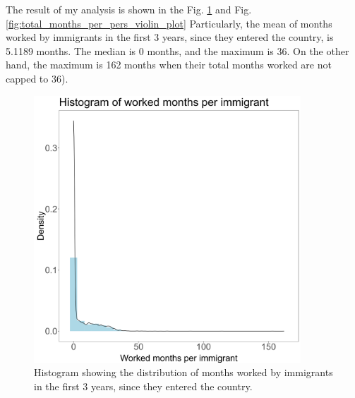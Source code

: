 \documentclass{article}
\begin{document}
	The result of my analysis is shown in the Fig. \ref{fig:total_months_per_pers_histogram} and Fig. \ref{fig:total_months_per_pers_violin_plot}
	Particularly, the mean of months worked by immigrants in the first 3 years, since they entered the country, is 5.1189 months.  The median is 0 months, and the maximum is 36. 
	On the other hand, the maximum is 162 months when their total months worked are not capped to 36).
	\begin{figure}[H]\centering
		\includegraphics[width=10cm]{total_months_per_pers_histogram}
		\caption{Histogram showing the distribution of months worked by immigrants in the first 3 years, since they entered the country.}
		\label{fig:total_months_per_pers_histogram}
	\end{figure}
\end{document}
